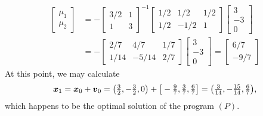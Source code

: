 \begin{example}
\begin{align*}
\begin{bmatrix} \mu_1 \\ \mu_2 \end{bmatrix} &= - \begin{bmatrix} 3/2 & 1 \\ 1 & 3 \end{bmatrix}^{-1} \begin{bmatrix} 1/2 & 1/2 & 1/2 \\ 1/2 & -1/2 & 1 \end{bmatrix} \begin{bmatrix} 3 \\ -3 \\ 0 \end{bmatrix} \\
&= - \begin{bmatrix} 2/7 & 4/7 & 1/7 \\ 1/14 & -5/14 & 2/7 \end{bmatrix} \begin{bmatrix} 3 \\ -3 \\ 0 \end{bmatrix} = \begin{bmatrix} 6/7 \\ -9/7 \end{bmatrix}
\end{align*}
At this point, we may calculate 
\begin{equation*}
\boldsymbol{x}_1 = \boldsymbol{x}_0 + \boldsymbol{v}_0 = \big( \tfrac{3}{2}, -\tfrac{3}{2}, 0 \big) + \big[ -\tfrac{9}{7}, \tfrac{3}{7}, \tfrac{6}{7} \big] = \big( \tfrac{3}{14}, -\tfrac{15}{14}, \tfrac{6}{7} \big),
\end{equation*}
which happens to be the optimal solution of the program $(P)$.
\end{example}